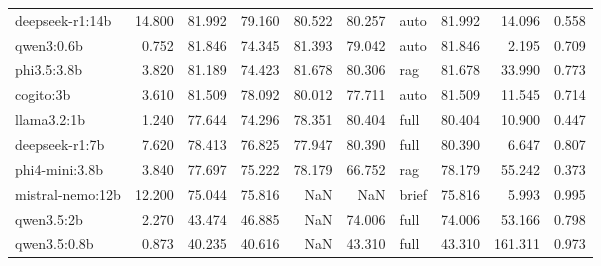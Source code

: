 \begin{tabular}{lrrrrrlrrr}
deepseek-r1:14b & 14.800 & 81.992 & 79.160 & 80.522 & 80.257 & auto & 81.992 & 14.096 & 0.558 \\
qwen3:0.6b & 0.752 & 81.846 & 74.345 & 81.393 & 79.042 & auto & 81.846 & 2.195 & 0.709 \\
phi3.5:3.8b & 3.820 & 81.189 & 74.423 & 81.678 & 80.306 & rag & 81.678 & 33.990 & 0.773 \\
cogito:3b & 3.610 & 81.509 & 78.092 & 80.012 & 77.711 & auto & 81.509 & 11.545 & 0.714 \\
llama3.2:1b & 1.240 & 77.644 & 74.296 & 78.351 & 80.404 & full & 80.404 & 10.900 & 0.447 \\
deepseek-r1:7b & 7.620 & 78.413 & 76.825 & 77.947 & 80.390 & full & 80.390 & 6.647 & 0.807 \\
phi4-mini:3.8b & 3.840 & 77.697 & 75.222 & 78.179 & 66.752 & rag & 78.179 & 55.242 & 0.373 \\
mistral-nemo:12b & 12.200 & 75.044 & 75.816 & NaN & NaN & brief & 75.816 & 5.993 & 0.995 \\
qwen3.5:2b & 2.270 & 43.474 & 46.885 & NaN & 74.006 & full & 74.006 & 53.166 & 0.798 \\
qwen3.5:0.8b & 0.873 & 40.235 & 40.616 & NaN & 43.310 & full & 43.310 & 161.311 & 0.973 \\
\bottomrule
\end{tabular}
